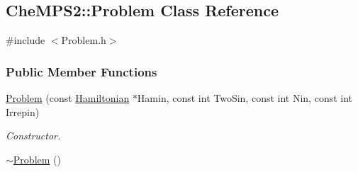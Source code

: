 \hypertarget{classCheMPS2_1_1Problem}{\subsection{Che\-M\-P\-S2\-:\-:Problem Class Reference}
\label{classCheMPS2_1_1Problem}
}


{\ttfamily \#include $<$Problem.\-h$>$}

\subsubsection*{Public Member Functions}
\begin{DoxyCompactItemize}
\item 
\hyperlink{classCheMPS2_1_1Problem_aeb177bf0d3fba3520a6fe263a90ee78c}{Problem} (const \hyperlink{classCheMPS2_1_1Hamiltonian}{Hamiltonian} $\ast$Hamin, const int Two\-Sin, const int Nin, const int Irrepin)
\begin{DoxyCompactList}\small\item\em Constructor. \end{DoxyCompactList}\item 
\hypertarget{classCheMPS2_1_1Problem_a9bc13e74cc92e3d697e9cc2ac589afc2}{\hyperlink{classCheMPS2_1_1Problem_a9bc13e74cc92e3d697e9cc2ac589afc2}{$\sim$\-Problem} ()}\label{classCheMPS2_1_1Problem_a9bc13e74cc92e3d697e9cc2ac589afc2}


\end{DoxyCompactItemize}
